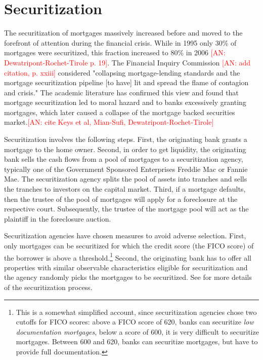 \documentclass[11pt,twopage]{article}
\newcommand{\AN}[1]{\textcolor{red}{[AN: #1]}}
\begin{document}

\section{Securitization}
\label{sec:securitization}


The securitization of mortgages massively increased before and moved
to the forefront of attention during the financial crisis. While in
1995 only 30\% of mortgages were securitized, this fraction increased
to 80\% in 2006 \AN{Dewatripont-Rochet-Tirole p. 19}. The Financial
Inquiry Commission \AN{add citation, p. xxiii} considered "collapsing
mortgage-lending standards and the mortgage securitization pipeline
[to have] lit and spread the flame of contagion and crisis."  The
academic literature has confirmed this view and found that mortgage
securitization led to moral hazard and to banks excessively granting
mortgages, which later caused a collapse of the mortgage backed
securities market.\AN{cite Keys et al, Mian-Sufi,
  Dewatripont-Rochet-Tirole}

Securitization involves the following steps. First, the originating
bank grants a mortgage to the home owner. Second, in order to get
liquidity, the originating bank sells the cash flows from a pool of
mortgages to a securitization agency, typically one of the Government
Sponsored Enterprises Freddie Mac or Fannie Mae. The securitization
agency splits the pool of assets into tranches and sells the tranches
to investors on the capital market. Third, if a mortgage defaults,
then the trustee of the pool of mortgages will apply for a foreclosure
at the respective court. Subsequently, the trustee of the mortgage
pool will act as the plaintiff in the foreclosure auction.

Securitization agencies have chosen measures to avoid adverse
selection. First, only mortgages can be securitized for which the
credit score (the FICO score) of the borrower is above a
threshold.\footnote{This is a somewhat simplified account, since
  securitization agencies chose two cutoffs for FICO scores: above a
  FICO score of 620, banks can securitize \emph{low documentation
    mortgages}, below a score of 600, it is very difficult to
  securitize mortgages. Between 600 and 620, banks can securitize
  mortgages, but have to provide full documentation.}  Second, the
originating bank has to offer all properties with similar observable
characteristics eligible for securitization and the agency randomly
picks the mortgages to be securitized. See \cite{keys2008did} for more
details of the securitization process.
\end{document}
